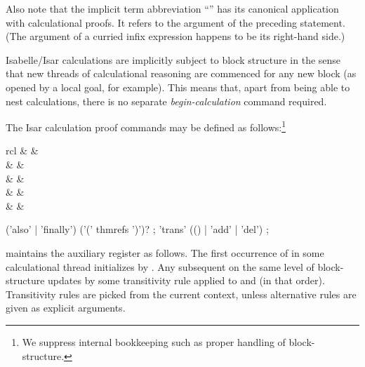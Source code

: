 \begin{isabellebody}
\begin{isamarkuptext}
  Also note that the implicit term abbreviation ``\isa{{\isasymdots}}'' has
  its canonical application with calculational proofs.  It refers to
  the argument of the preceding statement. (The argument of a curried
  infix expression happens to be its right-hand side.)

  Isabelle/Isar calculations are implicitly subject to block structure
  in the sense that new threads of calculational reasoning are
  commenced for any new block (as opened by a local goal, for
  example).  This means that, apart from being able to nest
  calculations, there is no separate \emph{begin-calculation} command
  required.

  \medskip The Isar calculation proof commands may be defined as
  follows:\footnote{We suppress internal bookkeeping such as proper
  handling of block-structure.}

  \begin{matharray}{rcl}
    \mbox{} & \equiv & \mbox{}~ \\
    \mbox{} & \equiv & \mbox{}~ \\[0.5ex]
    \mbox{} & \equiv & \mbox{}~\mbox{}~ \\[0.5ex]
    \mbox{} & \equiv & \mbox{}~ \\
    \mbox{} & \equiv & \mbox{}~\mbox{}~ \\
  \end{matharray}

  \begin{rail}
    ('also' | 'finally') ('(' thmrefs ')')?
    ;
    'trans' (() | 'add' | 'del')
    ;
  \end{rail}

  \begin{descr}

  \item [\mbox{\isa{\isacommand{also}}}~\isa{{\isacharparenleft}a\isactrlsub {\isadigit{1}}\ {\isasymdots}\ a\isactrlsub n{\isacharparenright}}]
  maintains the auxiliary \mbox{} register as follows.
  The first occurrence of \mbox{} in some calculational
  thread initializes \mbox{} by \mbox{}. Any
  subsequent \mbox{} on the same level of block-structure
  updates \mbox{} by some transitivity rule applied to
  \mbox{} and \mbox{} (in that order).  Transitivity
  rules are picked from the current context, unless alternative rules
  are given as explicit arguments.


\end{descr}
\end{isamarkuptext}
\end{isabellebody}

